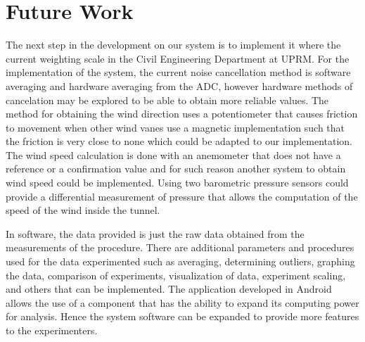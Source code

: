 \section{Future Work}

	The next step in the development on our system is to implement it where the current weighting scale in the Civil Engineering Department at UPRM. For the implementation of the system, the current noise cancellation method is software averaging and hardware averaging from the ADC, however hardware methods of cancelation may be explored to be able to obtain more reliable values. The method for obtaining the wind direction uses a potentiometer that causes friction to movement when other wind vanes use a magnetic implementation such that the friction is very close to none which could be adapted to our implementation. The wind speed calculation is done with an anemometer that does not have a reference or a confirmation value and for such reason another system to obtain wind speed could be implemented. Using two barometric pressure sensors could provide a differential measurement of pressure that allows the computation of the speed of the wind inside the tunnel.

	In software, the data provided is just the raw data obtained from the measurements of the procedure. There are additional parameters and procedures used for the data experimented such as averaging, determining outliers, graphing the data, comparison of experiments, visualization of data, experiment scaling, and others that can be implemented. The application developed in Android allows the use of a component that has the ability to expand its computing power for analysis. Hence the system software can be expanded to provide more features to the experimenters.